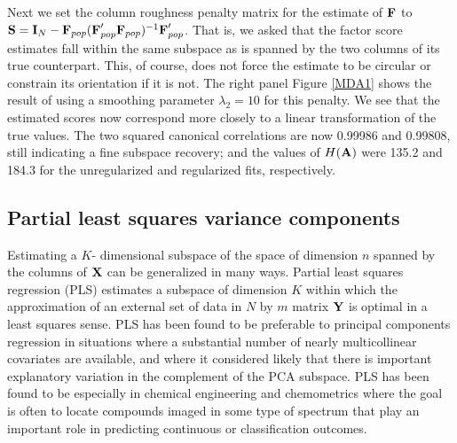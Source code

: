 \documentclass[12pt]{article}
\begin{document}
Next we set the column roughness penalty matrix for the estimate of $\mbox{\bf F}$ to $\mbox{\bf S} = \mbox{\bf I}_N - \mbox{\bf F}_{pop} (\mbox{\bf F}_{pop}' \mbox{\bf F}_{pop})^{-1} \mbox{\bf F}_{pop}'$.  That is, we asked that the factor score estimates fall within the same subspace as is spanned by the two columns of its true counterpart.  This, of course, does not force the estimate to be circular or constrain its orientation if it is not.  The right panel Figure \ref{MDA1} shows the result of using a smoothing parameter $\lambda_2 = 10$ for this penalty.  We see that the estimated scores now correspond more closely to a linear transformation of the true values.  The two squared canonical correlations are now 0.99986 and 0.99808, still indicating a fine subspace recovery; and the values of $H(\mbox{\bf A})$ were 135.2 and 184.3 for the unregularized and regularized fits, respectively.


\subsection{Partial least squares variance components}
\label{subsec:MVAPLS}

Estimating a $K$- dimensional subspace of the space of dimension $n$ spanned by the columns of $\mbox{\bf X}$ can be generalized in many ways.  Partial least squares regression (PLS) estimates a subspace of dimension $K$ within which the approximation of an external set of data in $N$ by $m$ matrix $\mbox{\bf Y}$ is optimal in a least squares sense.  PLS has been found to be preferable to principal components regression in situations where a substantial number of nearly multicollinear covariates are available, and where it considered likely that there is important explanatory variation in the complement of the PCA subspace.  PLS has been found to be especially in chemical engineering and chemometrics where the goal is often to locate compounds imaged in some type of spectrum that play an important role in predicting continuous or classification outcomes.
\end{document}
